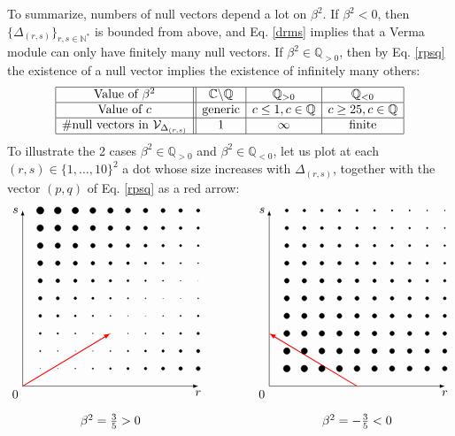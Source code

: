\documentclass[12pt, a4paper]{article}
\theoremstyle{break}
\begin{document}
To summarize, numbers of null vectors depend a lot on $\beta^2$. If $\beta^2<0$, then $\{\Delta_{(r, s)}\}_{r,s\in\mathbb{N}^*}$ is bounded from above, and Eq. \eqref{drms} implies that a Verma module can only have finitely many null vectors. If $\beta^2\in \mathbb{Q}_{>0}$, then by Eq. \eqref{rpsq} the existence of a null vector implies the existence of infinitely many others: 
\begin{align}
 \begin{array}{|c||c|c|c|}
  \hline 
  \text{Value of }\beta^2 & \mathbb{C}\backslash \mathbb{Q} & \mathbb{Q}_{>0} & \mathbb{Q}_{<0}
  \\
  \hline 
  \text{Value of }c & \text{generic} & c\leq 1 , c\in\mathbb{Q} &  c\geq 25, c\in\mathbb{Q}
  \\
  \hline 
  \#\text{null vectors in } \mathcal{V}_{\Delta_{(r, s)}} & 1 & \infty & \text{finite} 
  \\
  \hline 
 \end{array}
\end{align}
To illustrate the 2 cases $\beta^2\in \mathbb{Q}_{>0}$ and $\beta^2\in \mathbb{Q}_{<0}$, let us plot at each $(r,s)\in \{1,\dots, 10\}^2$ a dot whose size increases with 
$\Delta_{(r,s)}$, together with the vector $(p, q)$ of Eq. \eqref{rpsq} as a red arrow:
\begin{align}
 \begin{tikzpicture}[baseline=(base), scale = .5]
 \coordinate (base) at (0, 4);
  \draw[latex-latex] (0, 10) node [left] {$s$} -- (0, 0) node[below left] {$0$} -- (10, 0) node [below] {$r$};
  \draw[thick, red, -latex] (0, 0) -- (5, 3);
  \foreach \r in {1,...,10}{
  \foreach \s in {1,...,10}{
  \pgfmathsetmacro{\myrad}{.2+.12*abs(3*\r-5*\s)}
  \filldraw (\r, \s) circle [radius = \myrad pt];
  }}
  \node at (5, -2) {$\beta^2 = \frac35>0$};
 \end{tikzpicture}
 \qquad \qquad
 \begin{tikzpicture}[baseline=(base), scale = .5]
 \coordinate (base) at (0, 4);
  \draw[latex-latex] (0, 10) node [left] {$s$} -- (0, 0) node[below left] {$0$} -- (10, 0) node [below] {$r$};
  \draw[thick, red, -latex] (5, 0) -- (0, 3);
  \foreach \r in {1,...,10}{
  \foreach \s in {1,...,10}{
  \pgfmathsetmacro{\myrad}{6-(3*\r+5*\s)/15}
  \filldraw (\r, \s) circle [radius = \myrad pt];
  }}
  \node at (5, -2) {$\beta^2 = -\frac35<0$};
 \end{tikzpicture}
\end{align}
\end{document}
